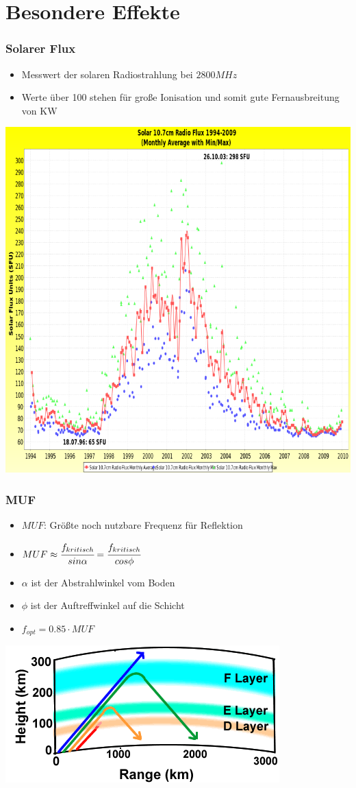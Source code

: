 \section*{Besondere Effekte}

\begin{frame}
  \frametitle{Solarer Flux}
  \begin{itemize}
    \item Messwert der solaren Radiostrahlung bei $2800 MHz$
    \item Werte über 100 stehen für große Ionisation und somit gute Fernausbreitung von KW
  \end{itemize}
  \begin{center}
    \includegraphics[width=.7\textwidth,height=.7\textheight,keepaspectratio]{a08/Solar_10_7_cm_Radio_Flux.png}
  \end{center}
\end{frame}

\begin{frame}
  \frametitle{MUF}
  \begin{center}
    \begin{itemize}
      \item $MUF$: Größte noch nutzbare Frequenz für Reflektion
      \item $MUF \approx \cfrac{f_{kritisch}}{sin{\alpha}} = \cfrac{f_{kritisch}}{cos{\phi}}$
      \item $\alpha$ ist der Abstrahlwinkel vom Boden
      \item $\phi$ ist der Auftreffwinkel auf die Schicht
      \item $f_{opt} = 0.85 \cdot MUF$
    \end{itemize}
    \includegraphics[width=.6\textwidth,height=.4\textheight,keepaspectratio]{a08/DifferentFrequencies-NPS.png}
  \end{center}
\end{frame}

